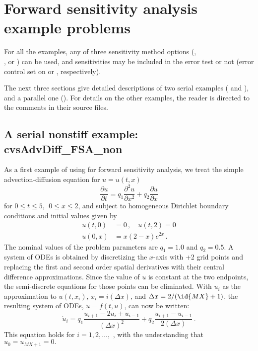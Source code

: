 \section{Forward sensitivity analysis example problems}\label{s:fwd_ex}

For all the {\cvodes} examples, any of three sensitivity method options
(, \\
, or ) can be used, and sensitivities may be 
included in the error test or not (error control set on  or ,
respectively).

The next three sections give detailed descriptions of two serial examples
( and ), 
and a parallel one ().
For details on the other examples, the reader is directed to the comments in
their source files.

\subsection{A serial nonstiff example: cvsAdvDiff\_FSA\_non}
\label{ss:cvsAdvDiff_FSA_non}

As a first example of using {\cvodes} for forward sensitivity analysis,
we treat the simple advection-diffusion equation
for $u=u(t,x)$
\begin{equation}\label{e:cvsAdvDiff_FSA_non_PDE}
  \frac{\partial u}{\partial t}= q_1 \frac{\partial ^{2}u}{\partial x^{2}}
  + q_2 \frac{\partial u}{\partial x}
\end{equation}
for $0 \leq t \leq 5, ~~ 0\leq x \leq 2$, and subject to homogeneous
Dirichlet boundary conditions and initial values given by 
\begin{equation}\label{e:cvsAdvDiff_FSA_non_BC_IC}
  \begin{split}
    u(t,0) &= 0 \, , \quad u(t,2) = 0 \\
    u(0,x) &= x(2-x)e^{2x} \, .
  \end{split}
\end{equation}
The nominal values of the problem parameters are $q_1 = 1.0$ and $q_2 = 0.5$.
A system of  ODEs is obtained by discretizing the $x$-axis with +2
grid points and replacing the first and second order spatial derivatives
with their central difference approximations. Since the value of $u$ is
constant at the two endpoints, the semi-discrete equations for those points
can be eliminated.  With $u_{i}$ as the approximation to $u(t,x_{i})$, 
$x_{i} = i(\Delta x)$, and $\Delta x=2/(\id{MX}+1)$, the resulting system of
ODEs, ${\dot u} = f(t,u)$, can now be written:
\begin{equation}\label{e:cvsAdvDiff_FSA_non_ODE}
  {\dot u}_i= q_1 \frac{u_{i+1}-2u_{i}+u_{i-1}}{(\Delta x)^{2}}
  + q_2 \frac{u_{i+1}-u_{i-1}}{2(\Delta x)} \, .
\end{equation}
This equation holds for $i=1,2,\ldots ,$ , with the understanding
that $u_{0} = u_{MX+1}=0.$

